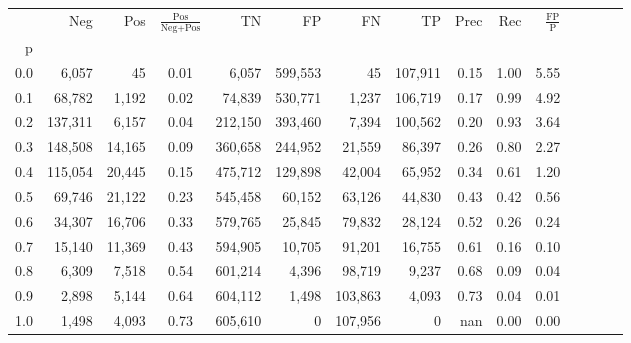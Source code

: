 \begin{tabular}{rrrcrrrrrrrrrrr}
\toprule
{} &      Neg &     Pos & $\frac{\text{Pos}}{\text{Neg}+\text{Pos}}$ &       TN &       FP &       FN &       TP &  Prec &   Rec & $\frac{\text{FP}}{\text{P}}$ \\
p   &          &         &                                            &          &          &          &          &       &       &                              \\
\midrule
0.0 &    6,057 &      45 &                                       0.01 &    6,057 &  599,553 &       45 &  107,911 &  0.15 &  1.00 &                         5.55 \\
0.1 &   68,782 &   1,192 &                                       0.02 &   74,839 &  530,771 &    1,237 &  106,719 &  0.17 &  0.99 &                         4.92 \\
0.2 &  137,311 &   6,157 &                                       0.04 &  212,150 &  393,460 &    7,394 &  100,562 &  0.20 &  0.93 &                         3.64 \\
0.3 &  148,508 &  14,165 &                                       0.09 &  360,658 &  244,952 &   21,559 &   86,397 &  0.26 &  0.80 &                         2.27 \\
0.4 &  115,054 &  20,445 &                                       0.15 &  475,712 &  129,898 &   42,004 &   65,952 &  0.34 &  0.61 &                         1.20 \\
0.5 &   69,746 &  21,122 &                                       0.23 &  545,458 &   60,152 &   63,126 &   44,830 &  0.43 &  0.42 &                         0.56 \\
0.6 &   34,307 &  16,706 &                                       0.33 &  579,765 &   25,845 &   79,832 &   28,124 &  0.52 &  0.26 &                         0.24 \\
0.7 &   15,140 &  11,369 &                                       0.43 &  594,905 &   10,705 &   91,201 &   16,755 &  0.61 &  0.16 &                         0.10 \\
0.8 &    6,309 &   7,518 &                                       0.54 &  601,214 &    4,396 &   98,719 &    9,237 &  0.68 &  0.09 &                         0.04 \\
0.9 &    2,898 &   5,144 &                                       0.64 &  604,112 &    1,498 &  103,863 &    4,093 &  0.73 &  0.04 &                         0.01 \\
1.0 &    1,498 &   4,093 &                                       0.73 &  605,610 &        0 &  107,956 &        0 &   nan &  0.00 &                         0.00 \\
\bottomrule
\end{tabular}
